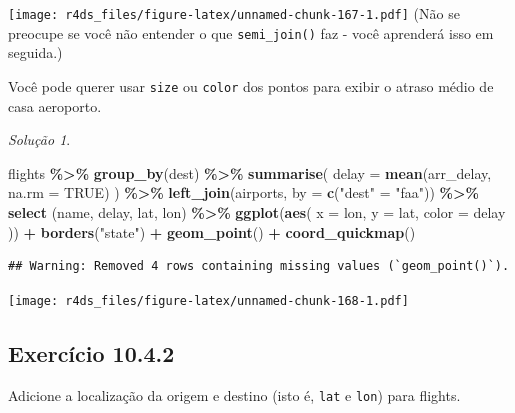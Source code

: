 \documentclass[
]{latex/krantz}
\newenvironment{Shaded}{\begin{snugshade}}{\end{snugshade}}
\newcommand{\AttributeTok}[1]{\textcolor[rgb]{0.13,0.29,0.53}{#1}}
\newcommand{\ConstantTok}[1]{\textcolor[rgb]{0.56,0.35,0.01}{#1}}
\newcommand{\FunctionTok}[1]{\textcolor[rgb]{0.13,0.29,0.53}{\textbf{#1}}}
\newcommand{\NormalTok}[1]{#1}
\newcommand{\OtherTok}[1]{\textcolor[rgb]{0.56,0.35,0.01}{#1}}
\newcommand{\SpecialCharTok}[1]{\textcolor[rgb]{0.81,0.36,0.00}{\textbf{#1}}}
\newcommand{\StringTok}[1]{\textcolor[rgb]{0.31,0.60,0.02}{#1}}
\theoremstyle{definition}
\theoremstyle{definition}
\theoremstyle{definition}
\theoremstyle{definition}
\theoremstyle{remark}
\newtheorem*{solution}{Solução}
\begin{document}
\texttt{[image: r4ds\_files/figure-latex/unnamed-chunk-167-1.pdf]}
(Não se preocupe se você não entender o que \texttt{semi\_join()} faz - você aprenderá isso em seguida.)

Você pode querer usar \texttt{size} ou \texttt{color} dos pontos para exibir o atraso médio de casa aeroporto.

\begin{solution}
\leavevmode

\begin{Shaded}
\begin{Highlighting}[]
\NormalTok{flights }\SpecialCharTok{\%\textgreater{}\%}
  \FunctionTok{group\_by}\NormalTok{(dest) }\SpecialCharTok{\%\textgreater{}\%}
  \FunctionTok{summarise}\NormalTok{(}
    \AttributeTok{delay =} \FunctionTok{mean}\NormalTok{(arr\_delay, }\AttributeTok{na.rm =} \ConstantTok{TRUE}\NormalTok{)}
\NormalTok{  ) }\SpecialCharTok{\%\textgreater{}\%}
  \FunctionTok{left\_join}\NormalTok{(airports, }\AttributeTok{by =} \FunctionTok{c}\NormalTok{(}\StringTok{"dest"} \OtherTok{=} \StringTok{"faa"}\NormalTok{)) }\SpecialCharTok{\%\textgreater{}\%}
  \FunctionTok{select}\NormalTok{ (name, delay, lat, lon) }\SpecialCharTok{\%\textgreater{}\%}
  \FunctionTok{ggplot}\NormalTok{(}\FunctionTok{aes}\NormalTok{(}
      \AttributeTok{x =}\NormalTok{ lon, }
      \AttributeTok{y =}\NormalTok{ lat,}
      \AttributeTok{color =}\NormalTok{ delay}
\NormalTok{  )) }\SpecialCharTok{+}
    \FunctionTok{borders}\NormalTok{(}\StringTok{"state"}\NormalTok{) }\SpecialCharTok{+} 
    \FunctionTok{geom\_point}\NormalTok{() }\SpecialCharTok{+}
    \FunctionTok{coord\_quickmap}\NormalTok{()}
\end{Highlighting}
\end{Shaded}

\begin{verbatim}
## Warning: Removed 4 rows containing missing values (`geom_point()`).
\end{verbatim}

\texttt{[image: r4ds\_files/figure-latex/unnamed-chunk-168-1.pdf]}

\end{solution}

\hypertarget{exr10-4-2}{%
\subsection*{Exercício 10.4.2}\label{exr10-4-2}}

Adicione a localização da origem e destino (isto é, \texttt{lat} e \texttt{lon}) para flights.
\end{document}
